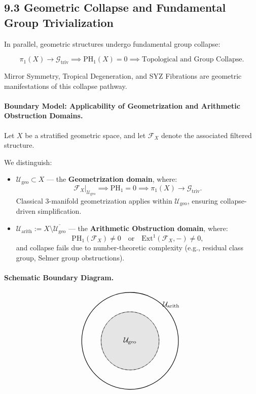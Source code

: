 \documentclass[11pt]{article}
\begin{document}
\subsection*{9.3 Geometric Collapse and Fundamental Group Trivialization}

In parallel, geometric structures undergo fundamental group collapse:

\[
\pi_1(X) \longrightarrow \mathcal{G}_{\mathrm{triv}} \implies \mathrm{PH}_1(X) = 0 \implies \text{Topological and Group Collapse}.
\]

Mirror Symmetry, Tropical Degeneration, and SYZ Fibrations are geometric manifestations of this collapse pathway.

\paragraph{Boundary Model: Applicability of Geometrization and Arithmetic Obstruction Domains.}

Let \( X \) be a stratified geometric space, and let \( \mathcal{F}_X \) denote the associated filtered structure.

We distinguish:

\begin{itemize}
    \item \( \mathcal{U}_{\mathrm{geo}} \subset X \) — the \textbf{Geometrization domain}, where:
    \[
    \mathcal{F}_X|_{\mathcal{U}_{\mathrm{geo}}} \implies \mathrm{PH}_1 = 0 \implies \pi_1(X) \longrightarrow \mathcal{G}_{\mathrm{triv}}.
    \]
    Classical 3-manifold geometrization applies within \( \mathcal{U}_{\mathrm{geo}} \), ensuring collapse-driven simplification.

    \item \( \mathcal{U}_{\mathrm{arith}} := X \setminus \overline{\mathcal{U}_{\mathrm{geo}}} \) — the \textbf{Arithmetic Obstruction domain}, where:
    \[
    \mathrm{PH}_1(\mathcal{F}_X) \neq 0 \quad \text{or} \quad \mathrm{Ext}^1(\mathcal{F}_X, -) \neq 0,
    \]
    and collapse fails due to number-theoretic complexity (e.g., residual class group, Selmer group obstructions).
\end{itemize}

\paragraph{Schematic Boundary Diagram.}

\[
\begin{tikzpicture}[scale=1.2]
\draw[thick] (0,0) circle (2);
\draw[fill=gray!20] (0,0) circle (1.2);
\node at (0,0) {\( \mathcal{U}_{\mathrm{geo}} \)};
\node at (1.7,1.5) {\( \mathcal{U}_{\mathrm{arith}} \)};
\draw[dashed] (0,0) circle (1.2);
\end{tikzpicture}
\]
\end{document}
